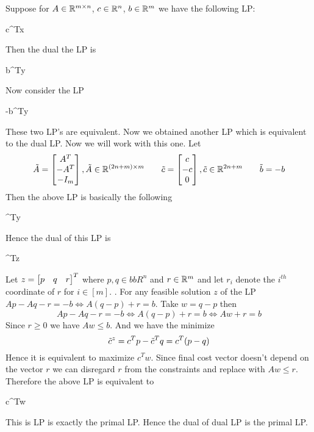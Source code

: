 \begin{proof-of-lemma}
	Suppose for $A\in\mathbb{R}^{m\times n}$, $c\in\mathbb{R}^n$, $b\in\mathbb{R}^m$ we have the following LP:\begin{maxi*}{}{c^Tx}{}{}
	\end{maxi*}
	Then the dual the LP is 		\begin{mini*}{}{b^Ty}{}{}
	\end{mini*}

	Now consider the LP

	\begin{maxi*}{}{-b^Ty}{}{}
	\end{maxi*}

	These two LP's are equivalent. Now we obtained another LP which is equivalent to the dual LP. Now we will work with this one. Let $$\tilde{A}=\left[\begin{matrix}A^T\\ -A^T\\ -I_m\end{matrix}\right],\tilde{A}\in\mathbb{R}^{(2n+m)\times m}\qquad \tilde{c}=\left[\begin{matrix}c\\ -c\\ 0\end{matrix}\right],\tilde{c}\in\mathbb{R}^{2n+m}\qquad \tilde{b}=-b$$Then the above LP is basically the following 	\begin{maxi*}{}{\tdb^Ty}{}{}
	\end{maxi*}Hence the dual of this LP is 	\begin{mini*}{}{\tdc^Tz}{}{}
	\end{mini*}Let $z=\left[\begin{matrix} p & q & r\end{matrix}\right]^T$ where $p,q\in bbR^n$ and $r\in\mathbb{R}^m$ and let $r_i$ denote the $i^{th}$ coordinate of $r$ for $i\in [m]$. . For any feasible solution $z$ of the LP $Ap-Aq-r=-b\iff A(q-p)+r=b$. Take $w=q-p$ then $$Ap-Aq-r=-b\iff A(q-p)+r=b\iff Aw+r=b$$Since $r\geq 0$ we have $Aw\leq b$. And we have the minimize $$\tilde{c}^z=c^Tp-\tilde{c}^Tq=c^T(p-q)$$Hence it is equivalent to maximize $c^Tw$. Since final cost vector doesn't depend on the vector $r$ we can disregard $r$ from the constraints and replace with $Aw\leq r$. Therefore the above LP is equivalent to  \begin{maxi*}{}{c^Tw}{}{}
	\end{maxi*}This is LP is exactly the primal LP. Hence the dual of dual LP is the primal LP.
\end{proof-of-lemma}

